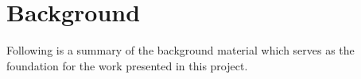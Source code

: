 \chapter{Background}
\label{ch:background}
Following is a summary of the background material which serves as the foundation
for the work presented in this project.


